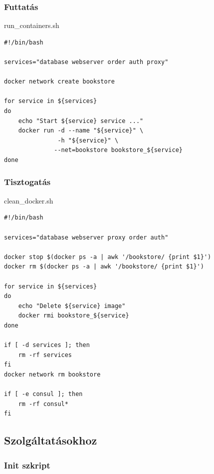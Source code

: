 \documentclass[11pt,magyar,a4paper,twoside,]{report}
\begin{document}
\subsubsection{\texorpdfstring{Futtatás\label{appendix-runner}}{Futtatás}}\label{futtatuxe1s}

run\_containers.sh

\begin{verbatim}
#!/bin/bash

services="database webserver order auth proxy"

docker network create bookstore

for service in ${services}
do
    echo "Start ${service} service ..."
    docker run -d --name "${service}" \
               -h "${service}" \
              --net=bookstore bookstore_${service}
done
\end{verbatim}

\subsubsection{\texorpdfstring{Tisztogatás\label{appendix-cleanup}}{Tisztogatás}}\label{tisztogatuxe1s}

clean\_docker.sh

\begin{verbatim}
#!/bin/bash

services="database webserver proxy order auth"

docker stop $(docker ps -a | awk '/bookstore/ {print $1}')
docker rm $(docker ps -a | awk '/bookstore/ {print $1}')

for service in ${services}
do
    echo "Delete ${service} image"
    docker rmi bookstore_${service}
done

if [ -d services ]; then
    rm -rf services
fi
docker network rm bookstore

if [ -e consul ]; then
    rm -rf consul*
fi
\end{verbatim}

\subsection{Szolgáltatásokhoz}\label{szolguxe1ltatuxe1sokhoz}

\subsubsection{\texorpdfstring{Init
szkript\label{appendix-starter}}{Init szkript}}\label{init-szkript}
\end{document}
